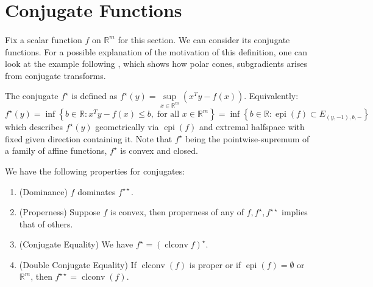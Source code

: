 \section{Conjugate Functions}
\label{sect:025}

\paragraph{}Fix a scalar function $f$ on $\mathbb{R}^m$ for this section. We can consider its conjugate functions. For a possible explanation of the motivation of this definition, one can look at the example following , which shows how polar cones, subgradients arises from conjugate transforms.

\begin{defn}[Conjugate]\label{defn:025-conjugate}
	The conjugate $f^\star$ is defined as $f^\star(y)=\underset{x\in \mathbb{R}^m}{\operatorname{sup}}\left(x^Ty-f(x)\right)$. Equivalently:
	\[
		f^\star(y)=\inf\left\{b\in \mathbb{R}:x^Ty-f(x)\leq b,\;\text{for all }x\in \mathbb{R}^m\right\} =\inf\left\{b\in \mathbb{R}:\operatorname{epi}(f)\subset E_{(y,-1),b,-}\right\}
	\]
	which describes $f^\star(y)$ geometrically via $\operatorname{epi}(f)$ and extremal halfspace with fixed given direction containing it.
	Note that $f^\star$ being the pointwise-supremum of a family of affine functions, $f^\star$ is convex and closed.
\end{defn}

\begin{prop}\label{prop:025-conjugacy-theorem}We have the following properties for conjugates:
	\begin{enumerate}[label=(\alph*)]
		\item (Dominance) $f$ dominates $f^{\star\star}$.
		\item (Properness) Suppose $f$ is convex, then properness of any of $f,f^{\star},f^{\star\star}$ implies that of others.
		\item (Conjugate Equality) We have $f^\star=(\operatorname{clconv}f)^\star$.
		\item (Double Conjugate Equality) If $\operatorname{clconv}(f)$ is proper or if $\operatorname{epi}(f)=\emptyset$ or $\mathbb{R}^m$, then $f^{\star\star}=\operatorname{clconv}(f)$.
	\end{enumerate}
\end{prop}

